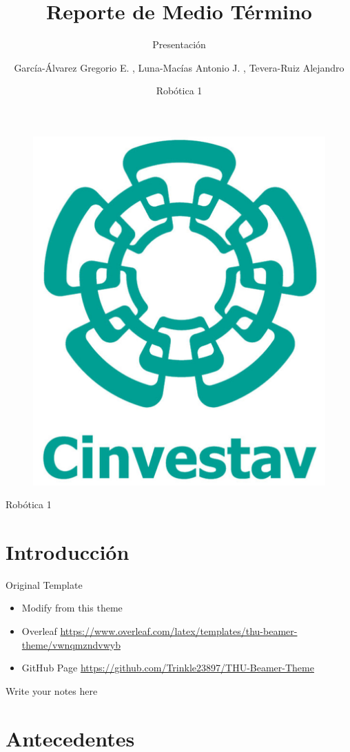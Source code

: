 \documentclass{beamer}
\author{García-Álvarez Gregorio E. , Luna-Macías Antonio J. , Tevera-Ruiz Alejandro}
\title{Reporte de Medio Término}
\subtitle{Presentación}
\institute [CINVESTAV] {Maestría en Ciencias de Robótica y Manufactura Avanzada}
\date{Robótica 1}
\begin{document}
\begin{frame}
    \titlepage
    \begin{figure}[htpb]
        \begin{center}
            \includegraphics[width=0.15\linewidth]{Cinvestav.jpg}
        \end{center}
    \end{figure}
    
    \begin{note}
        {Robótica 1}
    \end{note}

\end{frame}

\begin{frame}
    \tableofcontents[sectionstyle=show,subsectionstyle=show/shaded/hide,subsubsectionstyle=show/shaded/hide]
\end{frame}


\section{Introducción}

\begin{frame}{Original Template}
    \begin{itemize}[<+-| alert@+>] %
        \item Modify from this theme \cite{origin}
        \item Overleaf  \url{https://www.overleaf.com/latex/templates/thu-beamer-theme/vwnqmzndvwyb}
        \item GitHub Page \url{https://github.com/Trinkle23897/THU-Beamer-Theme}
    \end{itemize}
    
    \begin{note}
        {Write your notes here}
    \end{note}
\end{frame}



\section{Antecedentes}
\end{document}
